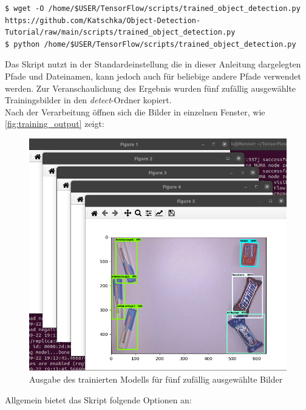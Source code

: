 \documentclass[12pt, oneside]{article}
\begin{document}
\begin{verbatim}    
$ wget -O /home/$USER/TensorFlow/scripts/trained_object_detection.py https://github.com/Katschka/Object-Detection-Tutorial/raw/main/scripts/trained_object_detection.py
$ python /home/$USER/TensorFlow/scripts/trained_object_detection.py
\end{verbatim} 
Das Skript nutzt in der Standardeinstellung die in dieser Anleitung dargelegten Pfade und Dateinamen, kann jedoch auch für beliebige andere Pfade verwendet werden. Zur Veranschaulichung des Ergebnis wurden fünf zufällig ausgewählte Trainingsbilder in den \textit{detect}-Ordner kopiert.\\

Nach der Verarbeitung öffnen sich die Bilder in einzelnen Fenster, wie \autoref{fig:training_output} zeigt:

\begin{figure}[htbp]
	\centering
	\includegraphics[width=\textwidth]{Bilder/misc/training_output}
	\caption{Ausgabe des trainierten Modells für fünf zufällig ausgewählte Bilder}
	\label{fig:training_output}
\end{figure}	
Allgemein bietet das Skript folgende Optionen an:
\end{document}
